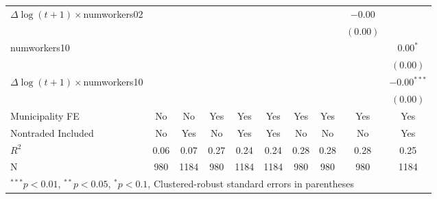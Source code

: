 \begin{tabular}{l c c c c c c c c c }
$\Delta\log(t+1)\times$numworkers02  &              &              &              &              &              &              &              & $-0.00$      &               \\
                     &              &              &              &              &              &              &              & $(0.00)$     &               \\
numworkers10         &              &              &              &              &              &              &              &              & $0.00^{*}$    \\
                     &              &              &              &              &              &              &              &              & $(0.00)$      \\
$\Delta\log(t+1)\times$numworkers10  &              &              &              &              &              &              &              &              & $-0.00^{***}$ \\
                     &              &              &              &              &              &              &              &              & $(0.00)$      \\
\hline
Municipality FE      & No & No & Yes& Yes&Yes&Yes &Yes &Yes &Yes            \\ 
Nontraded Included   & No & Yes&  No& Yes&Yes&No  &No  &No  &Yes            \\    
\hline
$R^2$                & 0.06         & 0.07         & 0.27         & 0.24         & 0.24         & 0.28         & 0.28         & 0.28         & 0.25          \\
N                    & 980          & 1184         & 980          & 1184         & 1184         & 980          & 980          & 980          & 1184          \\
\hline
\multicolumn{10}{l}{\scriptsize{$^{***}p<0.01$, $^{**}p<0.05$, $^*p<0.1$, Clustered-robust standard errors in parentheses}}
\end{tabular}
